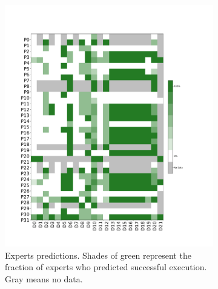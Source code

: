 \documentclass[conference]{IEEEtran}
\begin{document}
\begin{figure}
\centering
\begin{subfigure}{.53\textwidth}  \includegraphics[width=\columnwidth]{figures/Commented Success Percentage.pdf}
  \caption{Experts predictions. Shades of green represent the fraction of experts who predicted successful execution. Gray means no data.}
  \label{fig:experts_matrix}
\end{subfigure} \hfill
\begin{subfigure}{.45\textwidth}

\end{subfigure}
\end{figure}
\end{document}
